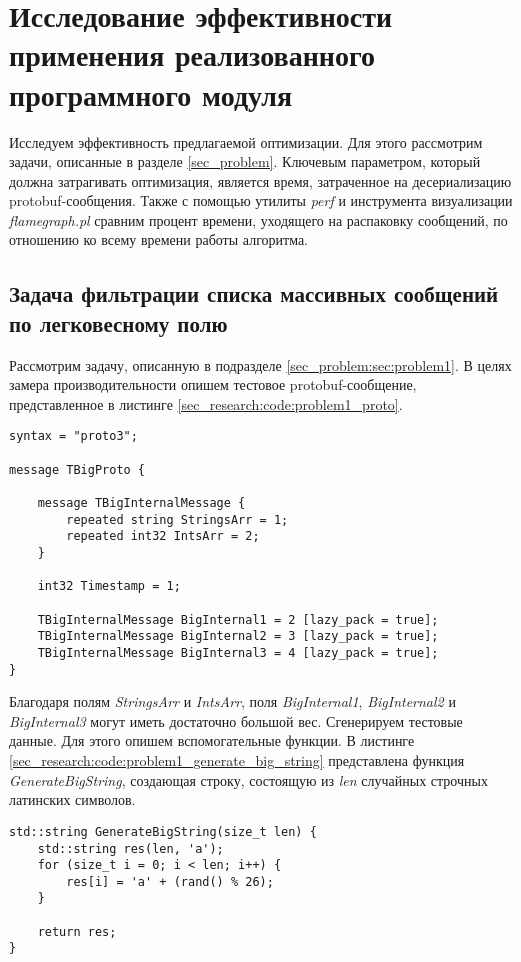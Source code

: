 \section{Исследование эффективности применения реализованного программного модуля}

Исследуем эффективность предлагаемой оптимизации. Для этого рассмотрим задачи, описанные в разделе \ref{sec_problem}.
Ключевым параметром, который должна затрагивать оптимизация, является время, затраченное на десериализацию protobuf-сообщения.
Также с помощью утилиты \textit{perf} и инструмента визуализации \textit{flamegraph.pl} сравним процент времени, уходящего на распаковку сообщений, по отношению ко всему времени работы алгоритма.

\subsection{Задача фильтрации списка массивных сообщений по легковесному полю}

Рассмотрим задачу, описанную в подразделе \ref{sec_problem:sec:problem1}.
В целях замера производительности опишем тестовое protobuf-сообщение, представленное в листинге \ref{sec_research:code:problem1_proto}.

\begin{lstlisting}[style=CodeListing, captionpos=b, caption={Тестовое protobuf-сообщение}, label=sec_research:code:problem1_proto]
syntax = "proto3";

message TBigProto {

    message TBigInternalMessage {
        repeated string StringsArr = 1;
        repeated int32 IntsArr = 2;
    }

    int32 Timestamp = 1;

    TBigInternalMessage BigInternal1 = 2 [lazy_pack = true];
    TBigInternalMessage BigInternal2 = 3 [lazy_pack = true];
    TBigInternalMessage BigInternal3 = 4 [lazy_pack = true];
}
\end{lstlisting}

Благодаря полям \textit{StringsArr} и \textit{IntsArr}, поля \textit{BigInternal1}, \textit{BigInternal2} и \textit{BigInternal3} могут иметь достаточно большой вес.
Сгенерируем тестовые данные. Для этого опишем вспомогательные функции. В листинге \ref{sec_research:code:problem1_generate_big_string} представлена функция \textit{GenerateBigString}, создающая строку, состоящую из \textit{len} случайных строчных латинских символов.

\begin{lstlisting}[style=CodeListing, captionpos=b, caption={Функция GenerateBigString}, label=sec_research:code:problem1_generate_big_string]
std::string GenerateBigString(size_t len) {
    std::string res(len, 'a');
    for (size_t i = 0; i < len; i++) {
        res[i] = 'a' + (rand() % 26);
    }

    return res;
}
\end{lstlisting}

